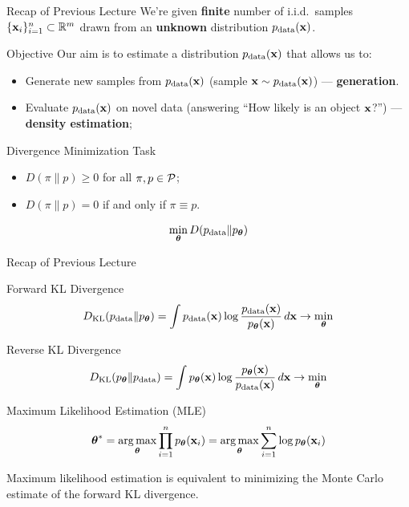 \documentclass{beamer}
\begin{document}
\begin{frame}
\titlepage
\resetonslide
\end{frame}
\begin{frame}{Recap of Previous Lecture}
	We're given \textbf{finite} number of i.i.d.\ samples $\{\mathbf{x}_i\}_{i=1}^n \subset \mathbb{R}^m$ drawn from an \textbf{unknown} distribution $p_{\text{data}}(\mathbf{x})$.
	\begin{block}{Objective}
		Our aim is to estimate a distribution $p_{\text{data}}(\mathbf{x})$ that allows us to: 
		\begin{itemize}
		    \item Generate new samples from $p_{\text{data}}(\mathbf{x})$ (sample $\mathbf{x} \sim p_{\text{data}}(\mathbf{x})$) --- \textbf{generation}.		    
		    \item Evaluate $p_{\text{data}}(\mathbf{x})$ on novel data (answering ``How likely is an object $\mathbf{x}$?'') --- \textbf{density estimation}; 
		\end{itemize}
	\end{block}

	\begin{block}{Divergence Minimization Task}
		\begin{itemize}
			\item $D(\pi \| p) \geq 0$ for all $\pi, p \in \mathcal{P}$;
			\item $D(\pi \| p) = 0$ if and only if $\pi \equiv p$.
		\end{itemize}
		\[
		\min_{\boldsymbol{\theta}} D(p_{\text{data}} \| p_{\boldsymbol{\theta}})
		\]
	\end{block}
\end{frame}
\begin{frame}{Recap of Previous Lecture}
	\begin{block}{Forward KL Divergence}
		\vspace{-0.2cm}
		\[
		D_\mathrm{KL}(p_{\text{data}} \| p_{\boldsymbol{\theta}}) = \int p_{\text{data}} (\mathbf{x}) \log \frac{p_{\text{data}}(\mathbf{x})}{p_{\boldsymbol{\theta}}(\mathbf{x})}\, d \mathbf{x} \rightarrow \min_{\boldsymbol{\theta}}
		\]
	\end{block}
	\begin{block}{Reverse KL Divergence}
		\vspace{-0.2cm}
		\[
		D_\mathrm{KL}(p_{\boldsymbol{\theta}} \| p_{\text{data}}) = \int p_{\boldsymbol{\theta}}(\mathbf{x}) \log \frac{p_{\boldsymbol{\theta}}(\mathbf{x})}{p_{\text{data}}(\mathbf{x})}\, d \mathbf{x} \rightarrow \min_{\boldsymbol{\theta}}
		\]
	\end{block}
	
	\begin{block}{Maximum Likelihood Estimation (MLE)}
		\vspace{-0.3cm}
		\[
		\boldsymbol{\theta}^* = \operatorname*{arg\,max}_{\boldsymbol{\theta}} \prod_{i=1}^n p_{\boldsymbol{\theta}}(\mathbf{x}_i) = \operatorname*{arg\,max}_{\boldsymbol{\theta}} \sum_{i=1}^n \log p_{\boldsymbol{\theta}}(\mathbf{x}_i)
		\]
		\vspace{-0.1cm}
	\end{block}
	Maximum likelihood estimation is equivalent to minimizing the Monte Carlo estimate of the forward KL divergence.
\end{frame}
\end{document}
